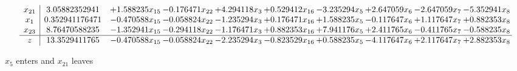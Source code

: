 \documentclass[10pt]{article}
\begin{document}
\[\begin{array}{c| c c@{\hskip 2pt} c@{\hskip 2pt} c@{\hskip 2pt} c@{\hskip 2pt} c@{\hskip 2pt} c@{\hskip 2pt} c@{\hskip 2pt} c@{\hskip 2pt} }
 x_{21}   &  3.05882352941 & + 1.588235 x_{15} & -0.176471 x_{22} & + 4.294118 x_{3} & + 0.529412 x_{16} & -3.235294 x_{5} & + 2.647059 x_{6} & -2.647059 x_{7} & -5.352941 x_{8}\\
 x_{1}   &  0.352941176471 & -0.470588 x_{15} & -0.058824 x_{22} & -1.235294 x_{3} & + 0.176471 x_{16} & + 1.588235 x_{5} & -0.117647 x_{6} & + 1.117647 x_{7} & + 0.882353 x_{8}\\
 x_{23}   &  8.76470588235 & -1.352941 x_{15} & -0.294118 x_{22} & -1.176471 x_{3} & + 0.882353 x_{16} & + 7.941176 x_{5} & + 2.411765 x_{6} & -0.411765 x_{7} & -0.588235 x_{8}\\
\hline
z    &  13.3529411765 & -0.470588 x_{15} & -0.058824 x_{22} & -2.235294 x_{3} & -0.823529 x_{16} & + 0.588235 x_{5} & -4.117647 x_{6} & + 2.117647 x_{7} & + 2.882353 x_{8}\\
\end{array}\]


 $ x_{5} $ enters and $ x_{21} $ leaves 
\end{document}

